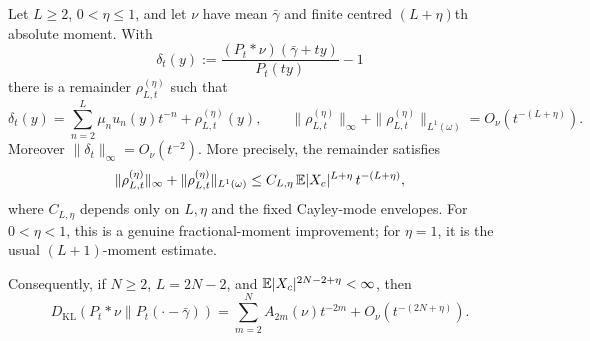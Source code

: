 \begin{lemma}
\label{lem:positive-margin-quotient-remainder}
\label{rem:positive-margin-retained-order}
\label{prop:density-to-entropy-descent}
\label{lem:closed-cayley-mode-constant-envelopes}
Let \(L\ge2\), \(0<\eta\le1\), and let \(\nu\) have mean
\(\bar{\gamma}\) and finite centred \((L+\eta)\)th absolute moment.  With
\[
\delta_t(y):=
\frac{(P_t*\nu)(\bar{\gamma}+ty)}{P_t(ty)}-1
\]
there is a remainder \(\rho_{L,t}^{(\eta)}\) such that
\begin{equation}\label{eq:positive-margin-density-remainder}
\delta_t(y)=
\sum_{n=2}^{L}\mu_nu_n(y)t^{-n}+\rho_{L,t}^{(\eta)}(y),
\qquad
\|\rho_{L,t}^{(\eta)}\|_{\infty}
+\|\rho_{L,t}^{(\eta)}\|_{L^1(\omega)}
=O_\nu(t^{-(L+\eta)}).
\end{equation}
Moreover \(\|\delta_t\|_\infty=O_\nu(t^{-2})\).
More precisely, the remainder satisfies
\[
\|\rho_{L,t}^{(\eta)}\|_{\infty}
+\|\rho_{L,t}^{(\eta)}\|_{L^1(\omega)}
\le
C_{L,\eta}\,\mathbb{E}|X_c|^{L+\eta}\,t^{-(L+\eta)},
\]
where \(C_{L,\eta}\) depends only on \(L,\eta\) and the fixed Cayley-mode
envelopes.  For \(0<\eta<1\), this is a genuine fractional-moment
improvement; for \(\eta=1\), it is the usual \((L+1)\)-moment estimate.

Consequently, if \(N\ge2\), \(L=2N-2\), and
\(\mathbb{E}|X_c|^{2N-2+\eta}<\infty\), then
\begin{equation}\label{eq:positive-margin-retained-order-theorem}
D_{\mathrm{KL}}(P_t*\nu\|P_t(\cdot-\bar{\gamma}))
=\sum_{m=2}^{N}A_{2m}(\nu)t^{-2m}
+O_\nu(t^{-(2N+\eta)}).
\end{equation}
\label{eq:explicit-entropy-constant-bound}
\end{lemma}

